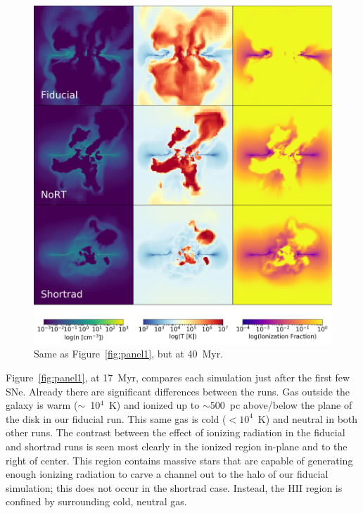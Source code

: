 \documentclass[twocolumn]{aastex62}
\begin{document}
{\begin{figure}
\centering
\includegraphics[width=0.99\linewidth]{DD0160_fiducial_shortrad_nort}
\caption{Same as Figure~\ref{fig:panel1}, but at 40~Myr.}
\label{fig:panel2}
\end{figure}

Figure~\ref{fig:panel1}, at 17~Myr, compares each simulation just after the first few SNe. Already there are significant differences between the runs. Gas outside the galaxy is warm ($\sim$~10$^{4}$~K) and ionized up to $\sim$500~pc above/below the plane of the disk in our fiducial run. This same gas is cold ($<10^4$~K) and neutral in both other runs. The contrast between the effect of ionizing radiation in the fiducial and shortrad runs is seen most clearly in the ionized region in-plane and to the right of center. This region contains massive stars that are capable of generating enough ionizing radiation to carve a channel out to the halo of our fiducial simulation; this does not occur in the shortrad case. Instead, the HII region is confined by surrounding cold, neutral gas. 

}
\end{document}

